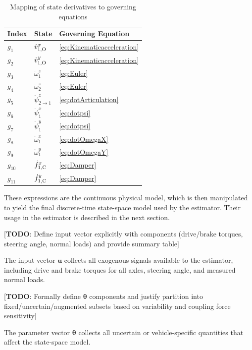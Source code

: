 \documentclass[conference]{IEEEtran}
\begin{document}
\begin{table}[h]
\centering
\caption{Mapping of state derivatives to governing equations}
\label{tab:state_mapping}
\begin{tabular}{lll}
\hline
Index & State & Governing Equation \\
\hline
$g_1$ & $\dot{v}^x_{1,\text{O}}$ & \eqref{eq:Kinematicacceleration} \\
$g_2$ & $\dot{v}^y_{1,\text{O}}$ & \eqref{eq:Kinematicacceleration} \\
$g_3$ & $\dot{\omega}^z_1$ & \eqref{eq:Euler} \\
$g_4$ & $\dot{\omega}^z_2$ & \eqref{eq:Euler} \\
$g_5$ & $\dot{\psi}^z_{2\to 1}$ & \eqref{eq:dotArticulation} \\
$g_6$ & $\dot{\psi}^x_1$ & \eqref{eq:dotpsi} \\
$g_7$ & $\dot{\psi}^y_1$ & \eqref{eq:dotpsi} \\
$g_8$ & $\dot{\omega}^x_1$ & \eqref{eq:dotOmegaX} \\
$g_9$ & $\dot{\omega}^y_1$ & \eqref{eq:dotOmegaY} \\
$g_{10}$ & $\dot{f}_{1,\text{C}}^x$ & \eqref{eq:Damper} \\
$g_{11}$ & $\dot{f}_{1,\text{C}}^y$ & \eqref{eq:Damper} \\
\hline
\end{tabular}
\end{table}

These expressions are the continuous physical model, which is then manipulated to yield the final discrete-time state-space model used by the estimator. Their usage in the estimator is described in the next section.

[\textbf{TODO}: Define input vector explicitly with components (drive/brake torques, steering angle, normal loads) and provide summary table]

The input vector $\bm u$ collects all exogenous signals available to the estimator, including drive and brake torques for all axles, steering angle, and measured normal loads.

[\textbf{TODO}: Formally define $\bm\theta$ components and justify partition into fixed/uncertain/augmented subsets based on variability and coupling force sensitivity]

The parameter vector $\bm\theta$ collects all uncertain or vehicle-specific quantities that affect the state-space model.
\end{document}
